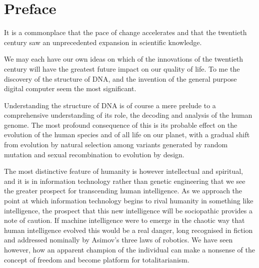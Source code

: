 
\newcommand{\listpositionname}{Positions}
\newlistof[chapter]{position}{pos}{\listpositionname}

\newcommand{\position}[2]{%
\refstepcounter{position}
{\paragraph{\textbf{#1 \theposition}} #2}
\addcontentsline{pos}{position}{\protect\numberline{\theposition} #2}\par}



\chapter*{Preface}\label{Preface}

It is a commonplace that the pace of change accelerates and that the twentieth century saw an unprecedented expansion in scientific knowledge.

We may each have our own ideas on which of the innovations of the twentieth century will have the greatest future impact on our quality of life.
To me the discovery of the structure of DNA, and the invention of the general purpose digital computer seem the most significant.

Understanding the structure of DNA is of course a mere prelude to a comprehensive understanding of its role, the decoding and analysis of the human genome.
The most profound consequence of this is its probable effect on the evolution of the human species and of all life on our planet, with a gradual shift from evolution by natural selection among variants generated by random mutation and sexual recombination to evolution by design.

The most distinctive feature of humanity is however intellectual and spiritual, and it is in information technology rather than genetic engineering that we see the greater prospect for transcending human intelligence.
As we approach the point at which information technology begins to rival humanity in something like intelligence, the prospect that this new intelligence will be sociopathic provides a note of caution.
If machine intelligence were to emerge in the chaotic way that human intelligence evolved this would be a real danger, long recognised in fiction and addressed nominally by Asimov's three laws of robotics.
We have seen however, how an apparent champion of the individual can make a nonsense of the concept of freedom and become platform for totalitarianism.

